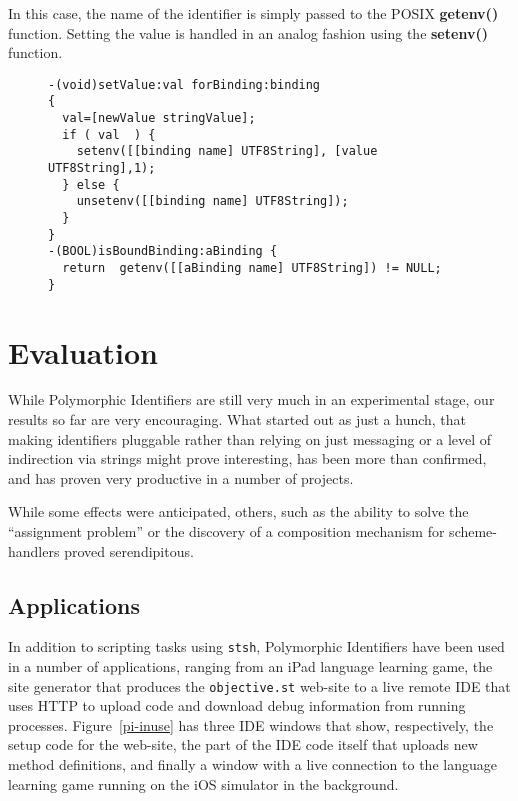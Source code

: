 \documentclass[preprint]{sigplanconf}
\begin{document}
In this case, the name of the identifier is simply passed to the POSIX {\bf getenv()} function.
Setting the value is handled in an analog fashion using the {\bf setenv()} function.


\begin{figure}[htbp]
\begin{lstlisting}[style=numbers,label=setvalue-env,caption=Set and check value in env: scheme.]
-(void)setValue:val forBinding:binding
{
  val=[newValue stringValue];
  if ( val  ) {
    setenv([[binding name] UTF8String], [value UTF8String],1);
  } else {
    unsetenv([[binding name] UTF8String]);
  }
}
-(BOOL)isBoundBinding:aBinding {
  return  getenv([[aBinding name] UTF8String]) != NULL;
}
\end{lstlisting}
\end{figure}



\section{Evaluation}
\label{evaluation}

While Polymorphic Identifiers are still very much in an experimental stage, our
results so far are very encouraging.  What started out as just a hunch, that making
identifiers pluggable rather than relying on just messaging or a level of indirection
via strings might prove interesting, has been more than confirmed, and has proven
very productive in a number of projects.

While some effects were anticipated, others, such as the ability to solve the
``assignment problem'' or the discovery of a composition mechanism for
scheme-handlers proved serendipitous.  



\subsection{Applications}

In addition to scripting tasks using {\tt stsh}, Polymorphic Identifiers have been used in a number
of applications, ranging from an iPad language learning game, the site generator that produces the {\tt objective.st} web-site to a
live remote IDE that uses HTTP to upload code and download debug information from running processes.  Figure~\ref{pi-inuse}
has three IDE windows that show, respectively, the setup code for the web-site, the part of the IDE code itself that uploads new method definitions,
and finally a window with a live connection to the language learning game running on the iOS simulator in the background.
\end{document}
